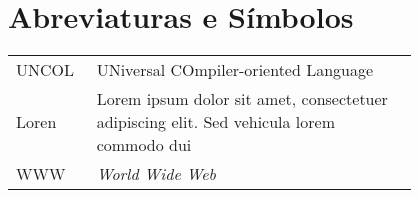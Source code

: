 \chapter*{Abreviaturas e Símbolos}

\begin{flushleft}
\begin{tabular}{l p{0.8\linewidth}}
UNCOL    & UNiversal COmpiler-oriented Language\\
Loren    & Lorem ipsum dolor sit amet, consectetuer adipiscing
elit. Sed vehicula lorem commodo dui\\
WWW      & \emph{World Wide Web}
\end{tabular}
\end{flushleft}

